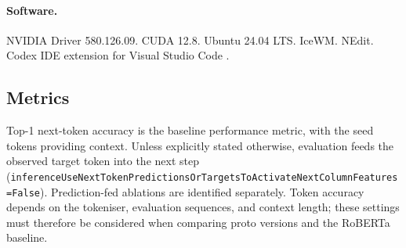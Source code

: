 \paragraph{Software.}
NVIDIA Driver 580.126.09. CUDA 12.8. Ubuntu 24.04 LTS. IceWM. NEdit. Codex IDE extension for Visual Studio Code \citep{openai2026codexIdeExtension}.

\subsection{Metrics}
Top-1 next-token accuracy is the baseline performance metric, with the seed tokens providing context. Unless explicitly stated otherwise, evaluation feeds the observed target token into the next step (\texttt{inferenceUseNextTokenPredictionsOrTargetsToActivateNextColumnFeatures=False}). Prediction-fed ablations are identified separately. Token accuracy depends on the tokeniser, evaluation sequences, and context length; these settings must therefore be considered when comparing proto versions and the RoBERTa baseline.
